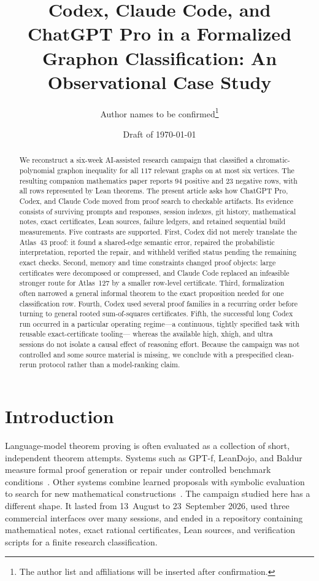\documentclass[11pt]{article}
\title{Codex, Claude Code, and ChatGPT Pro in a Formalized\\
Graphon Classification: An Observational Case Study}
\author{Author names to be confirmed\thanks{The author list and affiliations will be inserted after confirmation.}}
\date{Draft of \today}
\begin{document}
\maketitle

\begin{abstract}
We reconstruct a six-week AI-assisted research campaign that classified a
chromatic-polynomial graphon inequality for all $117$ relevant graphs on at
most six vertices.  The resulting companion mathematics paper reports $94$
positive and $23$ negative rows, with all rows represented by Lean theorems.
The present article asks how ChatGPT Pro, Codex, and Claude Code moved from
proof search to checkable artifacts.  Its evidence consists of surviving
prompts and responses, session indexes, git history, mathematical notes,
exact certificates, Lean sources, failure ledgers, and retained sequential
build measurements.  Five contrasts are supported.  First, Codex did not
merely translate the Atlas~43 proof: it found a shared-edge semantic error,
repaired the probabilistic interpretation, reported the repair, and withheld
verified status pending the remaining exact checks.  Second, memory and time
constraints changed proof objects: large certificates were decomposed or
compressed, and Claude Code replaced an infeasible stronger route for
Atlas~127 by a smaller row-level certificate.  Third, formalization often
narrowed a general informal theorem to the exact proposition needed for one
classification row.  Fourth, Codex used several proof families in a recurring
order before turning to general rooted sum-of-squares certificates.  Fifth,
the successful long Codex run occurred in a particular operating regime---a
continuous, tightly specified task with reusable exact-certificate tooling---
whereas the available high, xhigh, and ultra sessions do not isolate a causal
effect of reasoning effort.  Because the campaign was not controlled and
some source material is missing, we conclude with a prespecified clean-rerun
protocol rather than a model-ranking claim.
\end{abstract}

\section{Introduction}

Language-model theorem proving is often evaluated as a collection of short,
independent theorem attempts.  Systems such as GPT-f, LeanDojo, and Baldur
measure formal proof generation or repair under controlled benchmark
conditions~\cite{PoluSutskever2020,YangEtAl2023,FirstEtAl2023}.  Other systems
combine learned proposals with symbolic evaluation to search for new
mathematical constructions~\cite{RomeraParedesEtAl2024,TrinhEtAl2024}.  The
campaign studied here has a different shape.  It lasted from 13~August to
23~September 2026, used three commercial interfaces over many sessions, and
ended in a repository containing mathematical notes, exact rational
certificates, Lean sources, and verification scripts for a finite research
classification.
\end{document}
